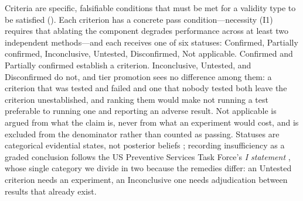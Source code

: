 \documentclass{article}
\begin{document}
Criteria are specific, falsifiable conditions that must be met for a validity type to be satisfied (). Each criterion has a concrete pass condition---necessity (I1) requires that ablating the component degrades performance across at least two independent methods---and each receives one of six statuses: Confirmed, Partially confirmed, Inconclusive, Untested, Disconfirmed, Not applicable. Confirmed and Partially confirmed establish a criterion. Inconclusive, Untested, and Disconfirmed do not, and tier promotion sees no difference among them: a criterion that was tested and failed and one that nobody tested both leave the criterion unestablished, and ranking them would make not running a test preferable to running one and reporting an adverse result. Not applicable is argued from what the claim is, never from what an experiment would cost, and is excluded from the denominator rather than counted as passing. Statuses are categorical evidential states, not posterior beliefs \citep{mayo2018statistical}; recording insufficiency as a graded conclusion follows the US Preventive Services Task Force's \emph{I statement} \citep{uspstf2021}, whose single category we divide in two because the remedies differ: an Untested criterion needs an experiment, an Inconclusive one needs adjudication between results that already exist.
\end{document}
